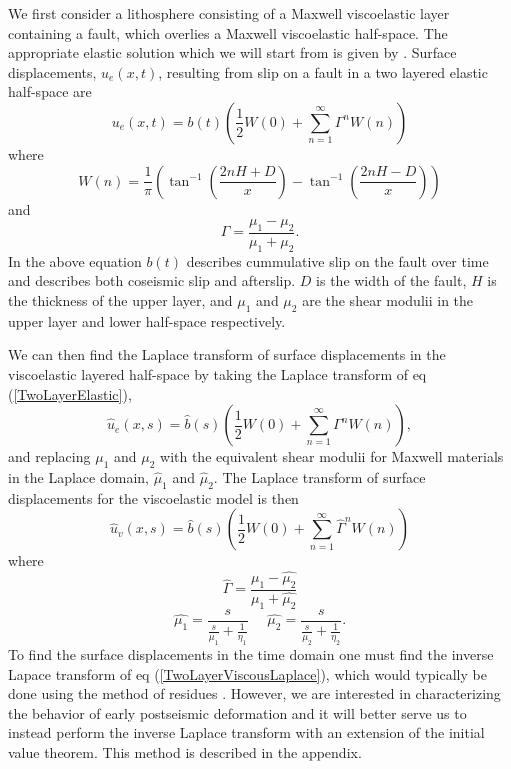 \documentclass[12pt]{article}
\begin{document}
We first consider a lithosphere consisting of a Maxwell viscoelastic
layer containing a fault, which overlies a Maxwell viscoelastic
half-space.  The appropriate elastic solution which we will start from
is given by \citet{R1971}.  Surface displacements, $u_{e}(x,t)$,
resulting from slip on a fault in a two layered elastic half-space
are
\begin{equation}\label{TwoLayerElastic}
  u_{e}(x,t) = b(t)\left(\frac{1}{2} W(0) + 
    \sum_{n=1}^\infty \Gamma^nW(n)\right)
\end{equation}
where
\begin{equation}
  W(n) = \frac{1}{\pi}\left(\tan^{-1}(\frac{2nH + D}{x}) 
    - \tan^{-1}(\frac{2nH - D}{x})\right)
\end{equation}
and
\begin{equation}
  \Gamma = \frac{\mu_1 - \mu_2}{\mu_1 + \mu_2}.
\end{equation}
In the above equation $b(t)$ describes cummulative slip on the fault
over time and describes both coseismic slip and afterslip. $D$ is the
width of the fault, $H$ is the thickness of the upper layer, and
$\mu_1$ and $\mu_2$ are the shear modulii in the upper layer and lower
half-space respectively.

We can then find the Laplace transform of surface displacements in the
viscoelastic layered half-space by taking the Laplace transform of eq
(\ref{TwoLayerElastic}), 
\begin{equation}\label{TwoLayerElasticLaplace}
 \hat{u}_e(x,s) = \hat{b}(s)\left(\frac{1}{2} W(0) +\sum_{n=1}^\infty\Gamma^nW(n)\right),
\end{equation}
and replacing $\mu_1$ and $\mu_2$ with the
equivalent shear modulii for Maxwell materials in the Laplace domain,
$\hat{\mu}_1$ and $\hat{\mu}_2$.  The Laplace transform of surface
displacements for the viscoelastic model is then
\begin{equation}\label{TwoLayerViscousLaplace}
 \hat{u}_v(x,s) = \hat{b}(s)\left(\frac{1}{2}W(0) +\sum_{n=1}^\infty\hat{\Gamma}^nW(n)\right)
\end{equation}
where
\begin{equation}
  \hat{\Gamma} = \frac{\hat{\mu_1} - \hat{\mu_2}}{\hat{\mu_1} + \hat{\mu_2}}
\end{equation}
\begin{equation}
  \hat{\mu_1} = \frac{s}{\frac{s}{\mu_1} + \frac{1}{\eta_1}} \,\,\,\,\,\,\,\,  
  \hat{\mu_2} = \frac{s}{\frac{s}{\mu_2} + \frac{1}{\eta_2}}.
\end{equation}
To find the surface displacements in the time domain one must find the
inverse Lapace transform of eq (\ref{TwoLayerViscousLaplace}), which
would typically be done using the method of residues
\citep[e.g.][]{NM1974}. However, we are interested in characterizing
the behavior of early postseismic deformation and it will better serve
us to instead perform the inverse Laplace transform with an extension
of the initial value theorem. This method is described in the appendix.
\end{document}
